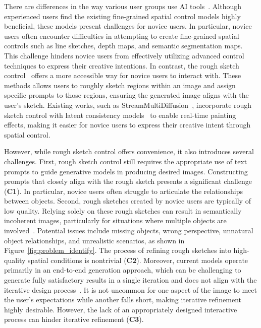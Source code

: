 There are differences in the way various user groups use AI tools~\cite{shi2023understanding}.
Although experienced users find the existing fine-grained spatial control models highly beneficial, these models present challenges for novice users.
In particular, novice users often encounter difficulties in attempting to create fine-grained spatial controls such as line sketches, depth maps, and semantic segmentation maps.
This challenge hinders novice users from effectively utilizing advanced control techniques to express their creative intentions.
In contrast, the rough sketch control~\cite{kim2023dense,bar2023multidiffusion,wang2024instancediffusion} offers a more accessible way for novice users to interact with. 
These methods allows users to roughly sketch regions within an image and assign specific prompts to those regions, ensuring the generated image aligns with the user's sketch. 
Existing works, such as StreamMultiDiffusion~\cite{lee2024streammultidiffusion}, incorporate rough sketch control with latent consistency models~\cite{luo2023lcm} to enable real-time painting effects, making it easier for novice users to express their creative intent through spatial control.


However, while rough sketch control offers convenience, it also introduces several challenges.
First, rough sketch control still requires the appropriate use of text prompts to guide generative models in producing desired images.
Constructing prompts that closely align with the rough sketch presents a significant challenge (\textbf{C1}).
In particular, novice users often struggle to articulate the relationships between objects.
Second, rough sketches created by novice users are typically of low quality.
Relying solely on these rough sketches can result in semantically incoherent images, particularly for situations where multiple objects are involved~\cite{bar2023multidiffusion}.
Potential issues include missing objects, wrong perspective, unnatural object relationships, and unrealistic scenarios, as shown in Figure~\ref{fig:problem_identify}.
The process of refining rough sketches into high-quality spatial conditions is nontrivial (\textbf{C2}).
Moreover, current models operate primarily in an end-to-end generation approach, which can be challenging to generate fully satisfactory results in a single iteration and does not align with the iterative design process~\cite{li2024realtimegen,huang2024plantography}. 
It is not uncommon for one aspect of the image to meet the user's expectations while another falls short, making iterative refinement highly desirable.
However, the lack of an appropriately designed interactive process can hinder iterative refinement (\textbf{C3}).


